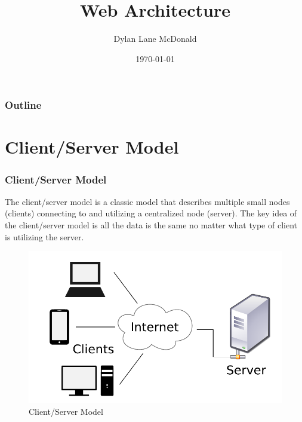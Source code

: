 \documentclass[aspectratio=169]{beamer}
\title{Web Architecture}
\author{Dylan Lane McDonald}
\institute{CNM STEMulus Center\\Web Development with PHP}
\date{\today}
\begin{document}
\begin{frame}
\titlepage
\end{frame}

\begin{frame}
\frametitle{Outline}
\tableofcontents
\end{frame}

\section{Client/Server Model}
\begin{frame}
\frametitle{Client/Server Model}
The client/server model is a classic model that describes multiple small nodes (clients) connecting to and utilizing a centralized node (server). The key idea of the client/server model is all the data is the same no matter what type of client is utilizing the server.

\begin{figure}
\includegraphics[scale=0.4]{../artifacts/client-server.pdf}
\caption{Client/Server Model}
\label{fig:client-server}
\end{figure}
\end{frame}
\end{document}

